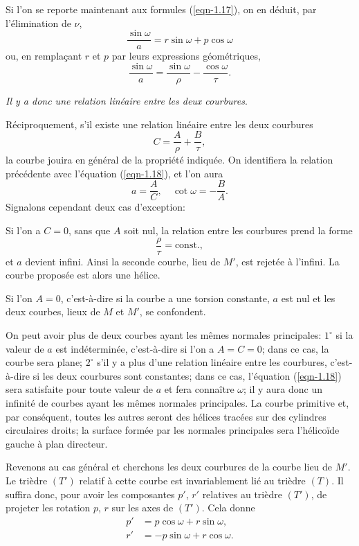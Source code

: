 Si l'on se reporte maintenant aux formules (\ref{eqn-1.17}), on en déduit, par l'élimination de $\nu$,
\[
	\frac{\sin{\omega}}{a} = r \sin\omega + p \cos\omega
\]
ou, en remplaçant $r$ et $p$ par leurs expressions géométriques,
\begin{equation}
	\frac{\sin{\omega}}{a} = \frac{\sin{\omega}}{\rho} - \frac{\cos{\omega}}{\tau}.
	\label{eqn-1.18}
\end{equation}

\textit{Il y a donc une relation linéaire entre les deux courbures}.

 Réciproquement, s'il existe une relation linéaire entre les deux courbures
\[
	C = \frac{A}{\rho} + \frac{B}{\tau},
\]
la courbe jouira en général de la propriété indiquée. On identifiera la relation précédente avec l'équation 
(\ref{eqn-1.18}), et l'on aura
\[
	a = \frac{A}{C}, \quad \cot{\omega} = -\frac{B}{A}.
\]
Signalons cependant deux cas d'exception:

Si l'on a $C=0$, sans que $A$ soit nul, la relation entre les courbures prend la forme
\[
	\frac{\rho}{\tau} = \textrm{const.},
\]
et $a$ devient infini. Ainsi la seconde courbe, lieu de $M'$, est rejetée à l'infini. La courbe proposée est alors une 
hélice.

Si l'on $A=0$, c'est-à-dire si la courbe a une torsion constante, $a$ est nul et les deux courbes, lieux de $M$ et 
$M'$, se confondent.

On peut avoir plus de deux courbes ayant les mêmes normales principales: $1^\circ$ si la valeur de $a$ est 
indéterminée, c'est-à-dire si l'on a $A=C=0$; dans ce cas, la courbe sera plane; $2^\circ$ s'il y a plus d'une relation 
linéaire entre les courbures, c'est-à-dire si les deux courbures sont constantes; dans ce cas, l'équation 
(\ref{eqn-1.18}) sera satisfaite pour toute valeur de $a$ et fera connaître $\omega$; il y aura donc un infinité de 
courbes ayant les mêmes normales principales. La courbe primitive et, par conséquent, toutes les autres seront des 
hélices tracées sur des cylindres circulaires droits; la surface formée par les normales principales sera l'hélicoïde 
gauche à plan directeur.

 Revenons au cas général et cherchons les deux courbures de la courbe lieu de $M'$. Le trièdre $(T')$ 
relatif à cette courbe est invariablement lié au trièdre $(T)$. Il suffira donc, pour avoir les composantes $p'$, $r'$ 
relatives au trièdre $(T')$, de projeter les rotation $p$, $r$ sur les axes de $(T')$. Cela donne
\begin{align*}
	p' &=  p\cos\omega + r\sin\omega, \\
	r' &= -p\sin\omega + r\cos\omega. %
\end{align*}

